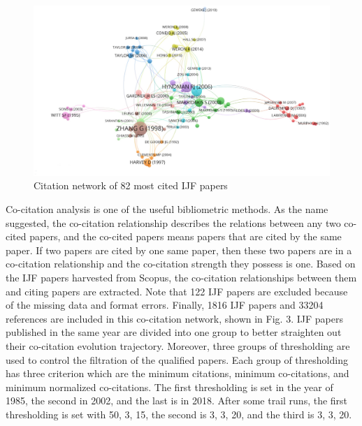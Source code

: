 \documentclass[11pt,a4paper]{elsarticle} %
\begin{document}
\begin{figure}[htbp]
\centering
\includegraphics[width=\textwidth]{fig.2.eps}
\caption{Citation network of 82 most cited IJF papers}
\end{figure}

Co-citation analysis is one of the useful bibliometric methods. As the
name suggested, the co-citation relationship describes the relations
between any two co-cited papers, and the co-cited papers means papers
that are cited by the same paper. If two papers are cited by one same
paper, then these two papers are in a co-citation relationship and the
co-citation strength they possess is one. Based on the IJF papers
harvested from Scopus, the co-citation relationships between them and
citing papers are extracted. Note that 122 IJF papers are excluded
because of the missing data and format errors. Finally, 1816 IJF papers
and 33204 references are included in this co-citation network, shown in
Fig. 3. IJF papers published in the same year are divided into one group
to better straighten out their co-citation evolution trajectory.
Moreover, three groups of thresholding are used to control the
filtration of the qualified papers. Each group of thresholding has three
criterion which are the minimum citations, minimum co-citations, and
minimum normalized co-citations. The first thresholding is set in the
year of 1985, the second in 2002, and the last is in 2018. After some
trail runs, the first thresholding is set with 50, 3, 15, the second is
3, 3, 20, and the third is 3, 3, 20.
\end{document}
